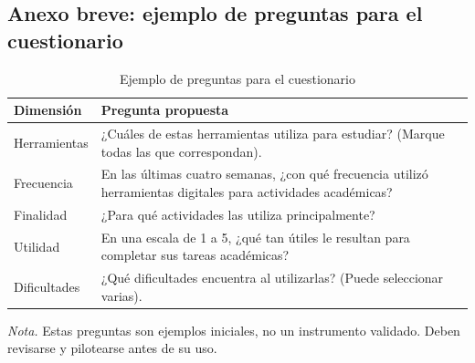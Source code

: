 
\subsection{Anexo breve: ejemplo de preguntas para el cuestionario}

\begin{table}[H]
    \caption{Ejemplo de preguntas para el cuestionario}
    \label{tab:preguntas-cuestionario}

    \small
    \renewcommand{\arraystretch}{1.3}

    \begin{tabularx}{\textwidth}{
        >{\raggedright\arraybackslash}p{}
        >{\raggedright\arraybackslash}X
    }
        \toprule
        \textbf{Dimensión} &
        \textbf{Pregunta propuesta} \\
        \midrule

        Herramientas &
        ¿Cuáles de estas herramientas utiliza para estudiar? (Marque todas las que correspondan). \\

        Frecuencia &
        En las últimas cuatro semanas, ¿con qué frecuencia utilizó herramientas digitales para actividades académicas? \\

        Finalidad &
        ¿Para qué actividades las utiliza principalmente? \\

        Utilidad &
        En una escala de 1 a 5, ¿qué tan útiles le resultan para completar sus tareas académicas? \\

        Dificultades &
        ¿Qué dificultades encuentra al utilizarlas? (Puede seleccionar varias). \\

        \bottomrule
    \end{tabularx}

    \vspace{2mm}
    \begin{minipage}{\textwidth}
        \footnotesize
        \textit{Nota.} Estas preguntas son ejemplos iniciales, no un instrumento validado. Deben revisarse y pilotearse antes de su uso.
    \end{minipage}
\end{table}
